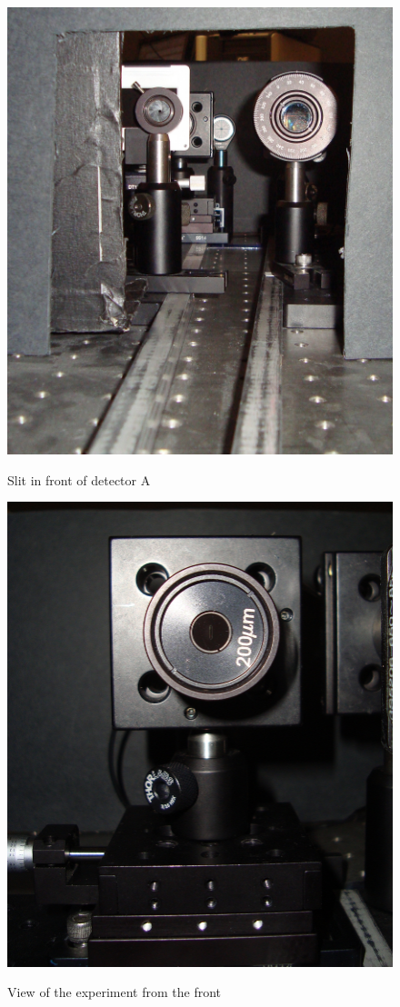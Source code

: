 \documentclass{../lab}
\begin{document}
\begin{figure}[H]
  \href{http://experimentationlab.berkeley.edu/sites/default/files/images/Qe_beamview.jpeg}{\includegraphics[width=\linewidth,keepaspectratio]{images/Qe_beamview.jpeg}}
  \caption{Slit in front of detector A}
  \label{fig:Qe_beamview.jpeg}
\endminipage\hfill
{}
  \href{http://experimentationlab.berkeley.edu/sites/default/files/images/Qe_slit.jpeg}{\includegraphics[width=\linewidth,keepaspectratio]{images/Qe_slit.jpeg}}\caption{View of the experiment from the front}

\end{figure}
\end{document}
